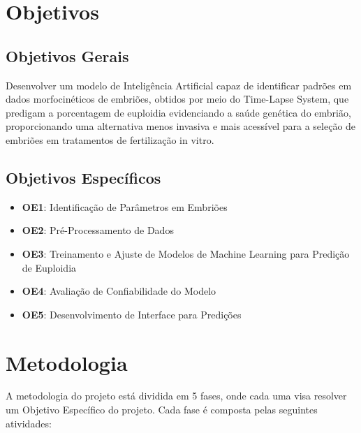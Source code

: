 \section{Objetivos}

\subsection{Objetivos Gerais}
Desenvolver um modelo de Inteligência Artificial capaz de identificar padrões em dados morfocinéticos de embriões, obtidos por meio do Time-Lapse System, que predigam a porcentagem de euploidia evidenciando a saúde genética do embrião, proporcionando uma alternativa menos invasiva e mais acessível para a seleção de embriões em tratamentos de fertilização in vitro.

\subsection{Objetivos Específicos}
\begin{itemize}
    \item \textbf{OE1}: Identificação de Parâmetros em Embriões
    \item \textbf{OE2}: Pré-Processamento de Dados
    \item \textbf{OE3}: Treinamento e Ajuste de Modelos de Machine Learning para Predição de Euploidia
    \item \textbf{OE4}: Avaliação de Confiabilidade do Modelo
    \item \textbf{OE5}: Desenvolvimento de Interface para Predições
\end{itemize}

\section{Metodologia}
A metodologia do projeto está dividida em 5 fases, onde cada uma visa resolver um Objetivo Específico do projeto. Cada fase é composta pelas seguintes atividades:

